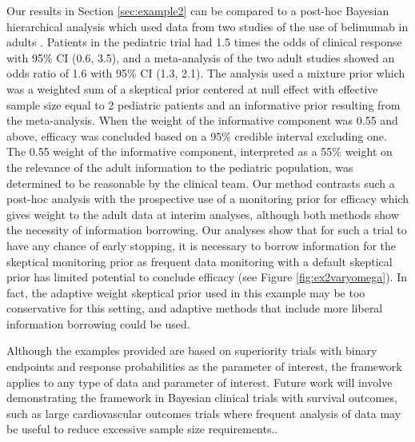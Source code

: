 \documentclass[useAMS,usenatbib,referee]{biom}
\begin{document}
Our results in Section \ref{sec:example2} can be compared to a post-hoc Bayesian hierarchical analysis which used data from two studies of the use of belimumab in adults \citep{Brunner2020}. Patients in the pediatric trial had 1.5 times the odds of clinical response with 95\% CI (0.6, 3.5), and a meta-analysis of the two adult studies showed an odds ratio of 1.6 with 95\% CI (1.3, 2.1). The analysis used a mixture prior which was a weighted sum of a skeptical prior centered at null effect with effective sample size equal to 2 pediatric patients and an informative prior resulting from the meta-analysis. When the weight of the informative component was 0.55 and above, efficacy was concluded based on a 95\% credible interval excluding one. The 0.55 weight of the informative component, interpreted as a 55\% weight on the relevance of the adult information to the pediatric population, was determined to be reasonable by the clinical team. Our method contrasts such a post-hoc analysis with the prospective use of a monitoring prior for efficacy which gives weight to the adult data at interim analyses, although both methods show the necessity of information borrowing. Our analyses show that for such a trial to have any chance of early stopping, it is necessary to borrow information for the skeptical monitoring prior as frequent data monitoring with a default skeptical prior has limited potential to conclude efficacy (see Figure \ref{fig:ex2varyomega}). In fact, the adaptive weight skeptical prior used in this example may be too conservative for this setting, and adaptive methods that include more liberal information borrowing could be used.

Although the examples provided are based on superiority trials with binary endpoints and response probabilities as the parameter of interest, the framework applies to any type of data and parameter of interest.
%
Future work will involve demonstrating the framework in Bayesian clinical trials with survival outcomes, such as large cardiovascular outcomes trials where frequent analysis of data may be useful to reduce excessive sample size requirements..


\end{document}
